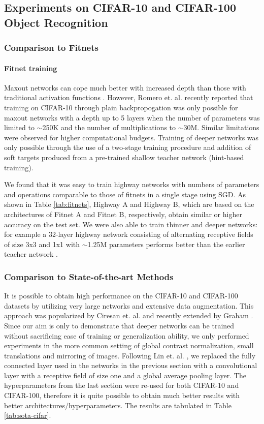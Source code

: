 \documentclass{article}
\begin{document}
\subsection{Experiments on CIFAR-10 and CIFAR-100 Object Recognition}
\subsubsection{Comparison to Fitnets}

\paragraph{Fitnet training} Maxout networks can cope much better with increased depth than those with traditional activation functions \cite{Goodfellow2013}. However, Romero et. al. \cite{Romero2014} recently reported that training on CIFAR-10 through plain backpropogation was only possible for maxout networks with a depth up to 5 layers when the number of parameters was limited to $\sim$250K and the number of multiplications to $\sim$30M. Similar limitations were observed for higher computational budgets. Training of deeper networks was only possible through the use of a two-stage training procedure and addition of soft targets produced from a pre-trained shallow teacher network (hint-based training). 

We found that it was easy to train highway networks with numbers of parameters and operations comparable to those of fitnets in a single stage using SGD. As shown in Table \ref{tab:fitnets}, Highway A and Highway B, which are based on the architectures of Fitnet A and Fitnet B, respectively, obtain similar or higher accuracy on the test set. We were also able to train thinner and deeper networks: for example a 32-layer highway network consisting of alternating receptive fields of size 3x3 and 1x1 with $\sim$1.25M parameters performs better than the earlier teacher network \cite{Goodfellow2013}.

\subsubsection{Comparison to State-of-the-art Methods}

It is possible to obtain high performance on the CIFAR-10 and CIFAR-100 datasets by utilizing very large networks and extensive data augmentation. This approach was popularized by Ciresan et. al. \cite{Ciresan2012} and recently extended by Graham \cite{Graham2014}. Since our aim is only to demonstrate that deeper networks can be trained without sacrificing ease of training or generalization ability, we only performed experiments in the more common setting of global contrast normalization, small translations and mirroring of images. Following Lin et. al. \cite{Lin2014}, we replaced the fully connected layer used in the networks in the previous section with a convolutional layer with a receptive field of size one and a global average pooling layer. The hyperparameters from the last section were re-used for both CIFAR-10 and CIFAR-100, therefore it is quite possible to obtain much better results with better architectures/hyperparameters. The results are tabulated in Table \ref{tab:sota-cifar}.
\end{document}
